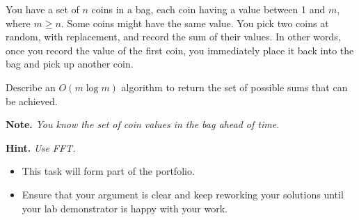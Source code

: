 \documentclass{article}
\begin{document}
\begin{question}
You have a set of $n$ coins in a bag, each coin having a value between 1 and $m$, where $m \geq n$. Some coins might have the same value. You pick two coins at random, with replacement, and record the sum of their values. In other words, once you record the value of the first coin, you immediately place it back into the bag and pick up another coin.

Describe an $O(m \log m)$ algorithm to return the set of possible sums that can be achieved.

{\bfseries Note.} {\em You know the set of coin values in the bag ahead of time.}

{\bfseries Hint.} {\em Use FFT.}
\end{question}

\begin{rubric}
\begin{itemize}
    \item This task will form part of the portfolio.
    \item Ensure that your argument is clear and keep reworking your solutions until your lab demonstrator is happy with your work.
\end{itemize}
\end{rubric}
\end{document}
